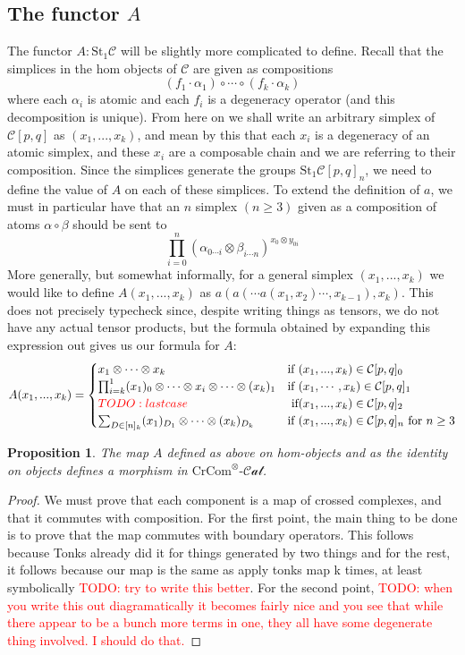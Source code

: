 \documentclass[12pt]{article}
\newtheorem{proposition}[theorem]{Proposition}
\theoremstyle{definition}
\newcommand{\TODO}[1]{\textcolor{red}{TODO: {#1}}}
\newcommand{\C}{\mathcal{C}}
\newcommand{\crcom}{\text{CrCom}}
\newcommand{\tensorcrossedcat}{\crcom^\otimes\text{-}\mathcal{Cat}}
\begin{document}
\subsection{The functor $A$}  
	The functor $A: \text{St}_1 \C$ will be slightly more complicated to define. Recall that the simplices in the hom objects of $\C$ are given as compositions 
	$$ (f_1 \cdot \alpha_1)\circ \cdots \circ (f_k \cdot \alpha_k )$$
	where each $\alpha_i$ is atomic and each $f_i$ is a degeneracy operator (and this decomposition is unique). 
	From here on we shall write an arbitrary simplex of $\C[p,q]$ as $(x_1,...,x_k)$, and mean by this that each $x_i$ is a degeneracy of an atomic simplex, and these $x_i$ are a composable chain and we are referring to their composition. Since the simplices generate the groups $\text{St}_1\C[p,q]_n$, we need to define the value of $A$ on each of these simplices. To extend the definition of $a$, we must in particular have that an $n$ simplex $(n \ge 3)$ given as a composition of atoms $\alpha \circ \beta$ should be sent to
	$$\prod_{i=0}^n \left( \alpha_{0\cdots i} \otimes \beta_{i \cdots  n}\right)^{x_0 \otimes y_{0i}}$$
More generally, but somewhat informally, for a general simplex $(x_1,...,x_k)$ we would like to define $A(x_1,...,x_k)$ as $a(a(\cdots a(x_1,x_2) \cdots, x_{k-1} ), x_k)$. This does not precisely typecheck since, despite writing things as tensors, we do not have any actual tensor products, but the formula obtained by expanding this expression out gives us our formula for $A$:
$$
A(x_1,...,x_k) = 
\begin{cases}
x_1 \otimes \cdots \otimes x_k & \text{if } (x_1,...,x_k) \in \C[p,q]_0 \\
\prod_{i = k}^1 (x_1)_0 \otimes \cdots \otimes x_i \otimes \cdots \otimes (x_k)_1 & \text{if } (x_1,\cdots,x_k) \in \C[p,q]_1 \\
\TODO{last case} & \text{ if} (x_1,...,x_k) \in \C[p,q]_2 \\
\sum_{D \in [n]_k} (x_1)_{D_1} \otimes \cdots \otimes (x_k)_{D_k} & \text{if } (x_1,...,x_k) \in \C[p,q]_n \text{ for } n \ge 3
\end{cases}
$$
\begin{proposition} 
	The map $A$ defined as above on hom-objects and as the identity on objects defines a morphism in $\tensorcrossedcat$.
\end{proposition}
\begin{proof}
	We must prove that each component is a map of crossed complexes, and that it commutes with composition. For the first point, the main thing to be done is to prove that the map commutes with boundary operators. This follows because Tonks already did it for things generated by two things and for the rest, it follows because our map is the same as apply tonks map k times, at least symbolically \TODO{try to write this better}. For the second point, \TODO{when you write this out diagramatically it becomes fairly nice and you see that while there appear to be a bunch more terms in one, they all have some degenerate thing involved. I should do that.}
\end{proof}
\end{document}
